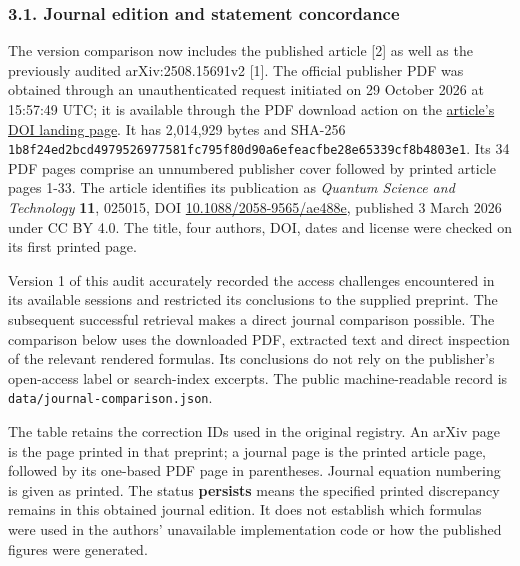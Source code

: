 \subsubsection{3.1. Journal edition and statement
concordance}\label{journal-edition-and-statement-concordance}

The version comparison now includes the published article {[}2{]} as
well as the previously audited arXiv:2508.15691v2 {[}1{]}. The official
publisher PDF was obtained through an unauthenticated request initiated
on 29 October 2026 at 15:57:49 UTC; it is available through the PDF
download action on the
\href{https://doi.org/10.1088/2058-9565/ae488e}{article's DOI landing
page}. It has 2,014,929 bytes and SHA-256
\nolinkurl{1b8f24ed2bcd4979526977581fc795f80d90a6efeacfbe28e65339cf8b4803e1}.
Its 34 PDF pages comprise an unnumbered publisher cover followed by
printed article pages 1-33. The article identifies its publication as
\emph{Quantum Science and Technology} \textbf{11}, 025015, DOI
\href{https://doi.org/10.1088/2058-9565/ae488e}{10.1088/2058-9565/ae488e},
published 3 March 2026 under CC BY 4.0. The title, four authors, DOI,
dates and license were checked on its first printed page.

Version 1 of this audit accurately recorded the access challenges
encountered in its available sessions and restricted its conclusions to
the supplied preprint. The subsequent successful retrieval makes a
direct journal comparison possible. The comparison below uses the
downloaded PDF, extracted text and direct inspection of the relevant
rendered formulas. Its conclusions do not rely on the publisher's
open-access label or search-index excerpts. The public machine-readable
record is \nolinkurl{data/journal-comparison.json}.

The table retains the correction IDs used in the original registry. An
arXiv page is the page printed in that preprint; a journal page is the
printed article page, followed by its one-based PDF page in parentheses.
Journal equation numbering is given as printed. The status
\textbf{persists} means the specified printed discrepancy remains in
this obtained journal edition. It does not establish which formulas were
used in the authors' unavailable implementation code or how the
published figures were generated.

